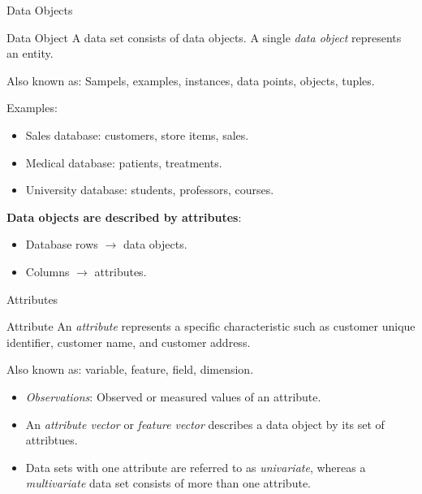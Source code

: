 \begin{frame}{Data Objects}
	\begin{block}{Data Object}
		A data set consists of data objects. A single \textit{data object} represents an entity.
	\end{block}

	Also known as: Sampels, examples, instances, data points, objects, tuples.\\\medskip

	Examples:
	\begin{itemize}
		\item Sales database: customers, store items, sales.
		\item Medical database: patients, treatments.
		\item University database: students, professors, courses.
	\end{itemize}

	\textbf{Data objects are described by attributes}:
	\begin{itemize}
		\item Database rows $\rightarrow$ data objects.
		\item Columns $\rightarrow$ attributes.
	\end{itemize}
\end{frame}

\begin{frame}{Attributes}
	\begin{block}{Attribute}
		An \textit{attribute} represents a specific characteristic such as customer
		unique identifier, customer name, and customer address.
	\end{block}

	Also known as: variable, feature, field, dimension.\\\medskip


	\begin{itemize}
		\item \textit{Observations}: Observed or measured values of an attribute.
		\item An \textit{attribute vector} or \textit{feature vector} describes a
		      data object by its set of attribtues.
		\item Data sets with one attribute are referred to as \textit{univariate},
		      whereas a \textit{multivariate} data set consists of more than one
		      attribute.
	\end{itemize}
\end{frame}

